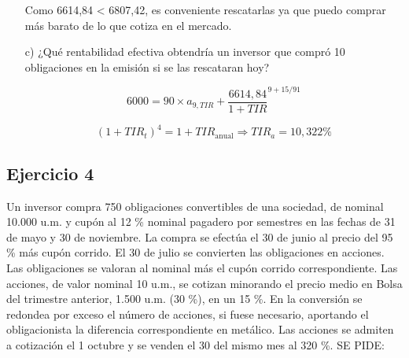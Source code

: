 \begin{enumerate}
    Como 6614,84 < 6807,42, es conveniente rescatarlas ya que puedo comprar más barato de lo que cotiza en el mercado.


    \item[c)] ¿Qué rentabilidad efectiva obtendría un inversor que compró 10 obligaciones en la emisión si se las rescataran hoy?
    
    \begin{equation*}
        6000 = 90 \times a_{9,TIR} + \frac{6614,84}{1+TIR}^{9+15/91}
    \end{equation*}

    \begin{equation*}
        (1 + TIR_t)^4 = 1 + TIR_{\text{anual}} \Rightarrow TIR_a = 10,322\%
    \end{equation*}

\end{enumerate}

\subsection*{Ejercicio 4}

Un inversor compra 750 obligaciones convertibles de una sociedad, de nominal 10.000 u.m. y cupón al 12 \% nominal pagadero por semestres en las fechas de 31 de mayo y 30 de noviembre. La compra se efectúa el 30 de junio al precio del 95 \% más cupón corrido. El 30 de julio se convierten las obligaciones en acciones. Las obligaciones se valoran al nominal más el cupón corrido correspondiente. Las acciones, de valor nominal 10 u.m., se cotizan minorando el precio medio en Bolsa del trimestre anterior, 1.500 u.m. (30 \%), en un 15 \%. En la conversión se redondea por exceso el número de acciones, si fuese necesario, aportando el obligacionista la diferencia correspondiente en metálico. Las acciones se admiten a cotización el 1 octubre y se venden el 30 del mismo mes al 320 \%. SE PIDE:

    
